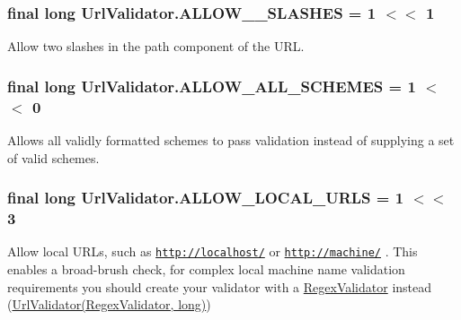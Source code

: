 \subsubsection[{\texorpdfstring{A\+L\+L\+O\+W\+\_\+2\+\_\+\+S\+L\+A\+S\+H\+ES}{ALLOW_2_SLASHES}}]{\setlength{\rightskip}{0pt plus 5cm}final long Url\+Validator.\+A\+L\+L\+O\+W\+\_\+\_\+\+S\+L\+A\+S\+H\+ES = 1 $<$$<$ 1\hspace{0.3cm}{\ttfamily [static]}}\hypertarget{classUrlValidator_a2a0966f94123825fcef6816a5d684ed2}{}\label{classUrlValidator_a2a0966f94123825fcef6816a5d684ed2}
Allow two slashes in the path component of the U\+RL. 
\subsubsection[{\texorpdfstring{A\+L\+L\+O\+W\+\_\+\+A\+L\+L\+\_\+\+S\+C\+H\+E\+M\+ES}{ALLOW_ALL_SCHEMES}}]{\setlength{\rightskip}{0pt plus 5cm}final long Url\+Validator.\+A\+L\+L\+O\+W\+\_\+\+A\+L\+L\+\_\+\+S\+C\+H\+E\+M\+ES = 1 $<$$<$ 0\hspace{0.3cm}{\ttfamily [static]}}\hypertarget{classUrlValidator_a1cd6766c458c99db9d98b585417a9623}{}\label{classUrlValidator_a1cd6766c458c99db9d98b585417a9623}
Allows all validly formatted schemes to pass validation instead of supplying a set of valid schemes. 
\subsubsection[{\texorpdfstring{A\+L\+L\+O\+W\+\_\+\+L\+O\+C\+A\+L\+\_\+\+U\+R\+LS}{ALLOW_LOCAL_URLS}}]{\setlength{\rightskip}{0pt plus 5cm}final long Url\+Validator.\+A\+L\+L\+O\+W\+\_\+\+L\+O\+C\+A\+L\+\_\+\+U\+R\+LS = 1 $<$$<$ 3\hspace{0.3cm}{\ttfamily [static]}}\hypertarget{classUrlValidator_a8614b7832fddf98bff7ddfb5dfdbff75}{}\label{classUrlValidator_a8614b7832fddf98bff7ddfb5dfdbff75}
Allow local U\+R\+Ls, such as \href{http://localhost/}{\tt http\+://localhost/} or \href{http://machine/}{\tt http\+://machine/} . This enables a broad-\/brush check, for complex local machine name validation requirements you should create your validator with a \hyperlink{classRegexValidator}{Regex\+Validator} instead (\hyperlink{classUrlValidator_a4dcb6938b73df2c093739f03ac6ed52d}{Url\+Validator(\+Regex\+Validator, long)}) 
